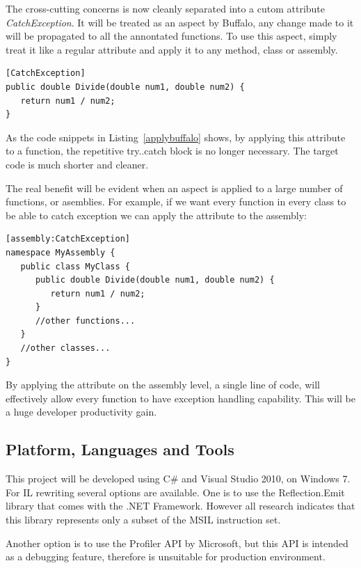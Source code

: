 The cross-cutting concerns is now cleanly separated into a cutom attribute {\em CatchException}. It will be treated as an aspect by Buffalo, any change made to it will be propagated to all the annontated functions. To use this aspect, simply treat it like a regular attribute and apply it to any method, class or assembly.

\begin{lstlisting}[caption={applying Buffalo aspect}, label=applybuffalo]
[CatchException]
public double Divide(double num1, double num2) {
   return num1 / num2;
}
\end{lstlisting}

As the code snippets in Listing~\ref{applybuffalo} shows, by applying this attribute to a function, the repetitive try..catch block is no longer necessary. The target code is much shorter and cleaner. 

The real benefit will be evident when an aspect is applied to a large number of functions, or asemblies. For example, if we want every function in every class to be able to catch exception we can apply the attribute to the assembly:

\begin{lstlisting}[caption={applying Buffalo aspect on an assembly}, label=applybuffaloassembly]
[assembly:CatchException]
namespace MyAssembly {
   public class MyClass {
      public double Divide(double num1, double num2) {
         return num1 / num2;
      }
      //other functions...
   }
   //other classes...
}
\end{lstlisting}

By applying the attribute on the assembly level, a single line of code, will effectively allow every function to have exception handling capability. This will be a huge developer productivity gain.

\subsection{Platform, Languages and Tools}
This project will be developed using C\# and Visual Studio 2010, on Windows 7. For IL rewriting several options are available. One is to use the Reflection.Emit library that comes with the .NET Framework. However all research indicates that this library represents only a subset of the MSIL instruction set.

Another option is to use the Profiler API by Microsoft, but this API is intended as a debugging feature, therefore is unsuitable for production environment.

